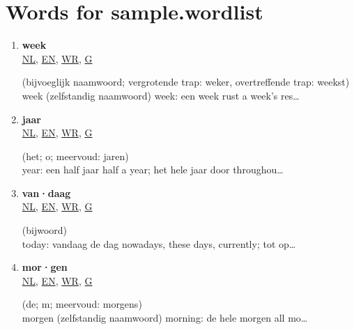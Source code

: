 \section{Words for sample.wordlist}

\begin{multicols}{2}
\begin{enumerate}
\item \parbox[t][][t]{35mm}{\textbf{week}\\\href{https://www.vandale.nl/gratis-woordenboek/nederlands/betekenis/week}{\tiny NL}{\tiny, }\href{https://www.vandale.nl/gratis-woordenboek/nederlands-engels/vertaling/week}{\tiny EN}{\tiny, }\href{https://www.wordreference.com/nlen/week}{\tiny WR}{\tiny, }\href{https://translate.google.com/\#view=home\&op=translate\&sl=nl\&tl=en\&text=week}{\tiny G}} \parbox[t][][t]{55mm}{(bijvoeglijk naamwoord; vergrotende trap: weker, overtreffende trap: weekst)\\week (zelfstandig naamwoord) week: een week rust a week's res\ldots}
\item \parbox[t][][t]{35mm}{\textbf{jaar}\\\href{https://www.vandale.nl/gratis-woordenboek/nederlands/betekenis/jaar}{\tiny NL}{\tiny, }\href{https://www.vandale.nl/gratis-woordenboek/nederlands-engels/vertaling/jaar}{\tiny EN}{\tiny, }\href{https://www.wordreference.com/nlen/jaar}{\tiny WR}{\tiny, }\href{https://translate.google.com/\#view=home\&op=translate\&sl=nl\&tl=en\&text=jaar}{\tiny G}} \parbox[t][][t]{55mm}{(het; o; meervoud: jaren)\\year: een half jaar half a year; het hele jaar door throughou\ldots}
\item \parbox[t][][t]{35mm}{\textbf{van·daag}\\\href{https://www.vandale.nl/gratis-woordenboek/nederlands/betekenis/vandaag}{\tiny NL}{\tiny, }\href{https://www.vandale.nl/gratis-woordenboek/nederlands-engels/vertaling/vandaag}{\tiny EN}{\tiny, }\href{https://www.wordreference.com/nlen/vandaag}{\tiny WR}{\tiny, }\href{https://translate.google.com/\#view=home\&op=translate\&sl=nl\&tl=en\&text=vandaag}{\tiny G}} \parbox[t][][t]{55mm}{(bijwoord)\\today: vandaag de dag nowadays, these days, currently; tot op\ldots}
\item \parbox[t][][t]{35mm}{\textbf{mor·gen}\\\href{https://www.vandale.nl/gratis-woordenboek/nederlands/betekenis/morgen}{\tiny NL}{\tiny, }\href{https://www.vandale.nl/gratis-woordenboek/nederlands-engels/vertaling/morgen}{\tiny EN}{\tiny, }\href{https://www.wordreference.com/nlen/morgen}{\tiny WR}{\tiny, }\href{https://translate.google.com/\#view=home\&op=translate\&sl=nl\&tl=en\&text=morgen}{\tiny G}} \parbox[t][][t]{55mm}{(de; m; meervoud: morgens)\\morgen (zelfstandig naamwoord) morning: de hele morgen all mo\ldots}

\end{enumerate}
\end{multicols}
